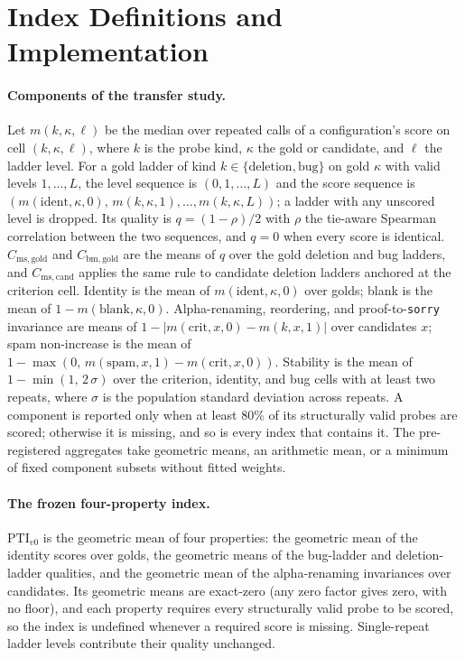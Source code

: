 \section{Index Definitions and Implementation}\label{app:index-definitions}
\paragraph{Components of the transfer study.}
Let $m(k,\kappa,\ell)$ be the median over repeated calls of a configuration's score on cell $(k,\kappa,\ell)$, where $k$ is the probe kind, $\kappa$ the gold or candidate, and $\ell$ the ladder level.
For a gold ladder of kind $k\in\{\text{deletion},\text{bug}\}$ on gold $\kappa$ with valid levels $1,\dots,L$, the level sequence is $(0,1,\dots,L)$ and the score sequence is $(m(\text{ident},\kappa,0),\,m(k,\kappa,1),\dots,m(k,\kappa,L))$; a ladder with any unscored level is dropped.
Its quality is $q=(1-\rho)/2$ with $\rho$ the tie-aware Spearman correlation between the two sequences, and $q=0$ when every score is identical.
$C_{\mathrm{ms,gold}}$ and $C_{\mathrm{bm,gold}}$ are the means of $q$ over the gold deletion and bug ladders, and $C_{\mathrm{ms,cand}}$ applies the same rule to candidate deletion ladders anchored at the criterion cell.
Identity is the mean of $m(\text{ident},\kappa,0)$ over golds; blank is the mean of $1-m(\text{blank},\kappa,0)$.
Alpha-renaming, reordering, and proof-to-\texttt{sorry} invariance are means of $1-|m(\text{crit},x,0)-m(k,x,1)|$ over candidates $x$; spam non-increase is the mean of $1-\max(0,\,m(\text{spam},x,1)-m(\text{crit},x,0))$.
Stability is the mean of $1-\min(1,\,2\,\sigma)$ over the criterion, identity, and bug cells with at least two repeats, where $\sigma$ is the population standard deviation across repeats.
A component is reported only when at least 80\% of its structurally valid probes are scored; otherwise it is missing, and so is every index that contains it.
The pre-registered aggregates take geometric means, an arithmetic mean, or a minimum of fixed component subsets without fitted weights.

\paragraph{The frozen four-property index.}
$\mathrm{PTI}_{v0}$ is the geometric mean of four properties: the geometric mean of the identity scores over golds, the geometric means of the bug-ladder and deletion-ladder qualities, and the geometric mean of the alpha-renaming invariances over candidates.
Its geometric means are exact-zero (any zero factor gives zero, with no floor), and each property requires every structurally valid probe to be scored, so the index is undefined whenever a required score is missing.
Single-repeat ladder levels contribute their quality unchanged.

